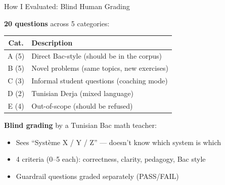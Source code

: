 \documentclass[aspectratio=169, 11pt]{beamer}
\begin{document}
\begin{frame}{How I Evaluated: Blind Human Grading}

\textbf{20 questions} across 5 categories:

\begin{center}
\small
\begin{tabular}{cl}
\toprule
\textbf{Cat.} & \textbf{Description} \\
\midrule
A (5) & Direct Bac-style (should be in the corpus) \\
B (5) & Novel problems (same topics, new exercises) \\
C (3) & Informal student questions (coaching mode) \\
D (2) & Tunisian Derja (mixed language) \\
E (4) & Out-of-scope (should be refused) \\
\bottomrule
\end{tabular}
\end{center}

\bigskip

\textbf{Blind grading} by a Tunisian Bac math teacher:
\begin{itemize}
    \item Sees ``Syst\`eme X / Y / Z'' --- doesn't know which system is which
    \item 4 criteria (0--5 each): correctness, clarity, pedagogy, Bac style
    \item Guardrail questions graded separately (PASS/FAIL)
\end{itemize}

\end{frame}
\end{document}
